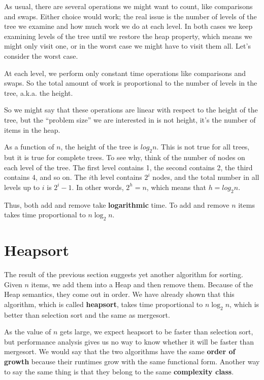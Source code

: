 As usual, there are several operations we might want to count,
like comparisons and swaps.  Either choice would work; the
real issue is the number of levels of the tree we examine
and how much work we do at each level.  In both cases we
keep examining levels of the tree until we restore the heap
property, which means we might only visit one, or in the worst
case we might
have to visit them all.  Let's consider the worst case.

At each level, we perform only constant time operations
like comparisons and swaps.  So the total amount of work is
proportional to the number of levels in the tree, a.k.a.
the height.

So we might say that these operations are linear with respect to
the height of the tree, but the ``problem size'' we are interested
in is not height, it's the number of items in the heap.

As a function of $n$, the height of the tree is $log_2 n$.
This is not true for all trees, but it is true for complete
trees.  To see why, think of the number of nodes on each level
of the tree.  The first level contains 1, the second contains 2,
the third contains 4, and so on.  The $i$th level contains
$2^i$ nodes, and the total number in all levels up to $i$ is
$2^i - 1$.  In other words, $2^h = n$, which means that
$h = log_2 n$.


Thus, both add and remove take {\bf logarithmic} time.
To add and remove $n$ items takes time proportional to
$n \log_2 n$.


\section{Heapsort}

The result of the previous section suggests yet another algorithm
for sorting.  Given $n$ items, we add them into a Heap and
then remove them.  Because of the Heap semantics, they come
out in order.  We have already shown that this algorithm, which
is called {\bf heapsort}, takes time proportional to $n \log_2 n$,
which is better than selection sort and the same as mergesort.

As the value of $n$ gets large, we expect heapsort to be faster
than selection sort, but performance analysis gives us no way
to know whether it will be faster than mergesort.  We would say
that the two algorithms have the same {\bf order of growth} because
their runtimes grow with the same functional form.  Another way to
say the same thing is that they belong to the same {\bf complexity
class}.

